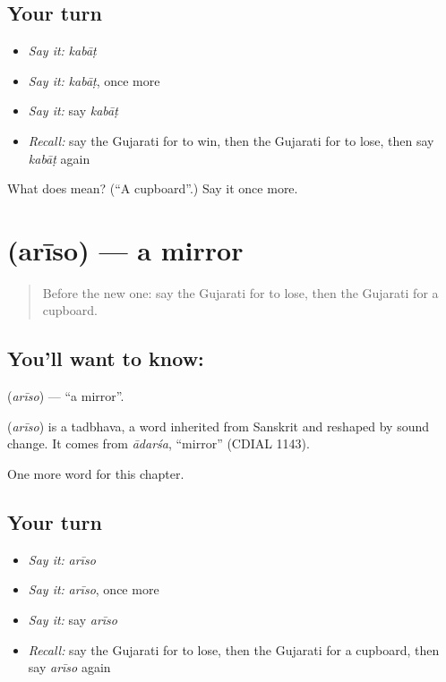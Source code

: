 \subsection*{Your turn}
\begin{itemize}
\raggedright
  \item \emph{Say it:} \emph{kabāṭ}
  \item \emph{Say it:} \emph{kabāṭ}, once more
  \item \emph{Say it:} say \emph{kabāṭ}
  \item \emph{Recall:} say the Gujarati for to win, then the Gujarati for to lose, then say \emph{kabāṭ} again
\end{itemize}

\begin{tcolorbox}[breakable,colback=teal!4,colframe=teal!35!black,title={Before you move on}]
What does  mean? (\textquotedblleft{}A cupboard\textquotedblright{}.) Say it once more.
\end{tcolorbox}
\section[\texorpdfstring{\gu{અરીસો} (arīso)}{અરીસો (arīso)}]{ (arīso) — a mirror}

\label{lesson:GU-C106-ariso}



\begin{quote}
Before the new one: say the Gujarati for to lose, then the Gujarati for a cupboard.
\end{quote}

\subsection*{You'll want to know: }
\textbf{} (\emph{arīso}) — \textquotedblleft{}a mirror\textquotedblright{}.

\begin{cousinweb}
\textbf{} (\emph{arīso}) is a tadbhava, a word inherited from Sanskrit and reshaped by sound change. It comes from \emph{ādarśa}, \textquotedblleft{}mirror\textquotedblright{} (CDIAL 1143).
\end{cousinweb}

\begin{grammarlens}[title={What you've built}]
One more word for this chapter.
\end{grammarlens}

\subsection*{Your turn}
\begin{itemize}
\raggedright
  \item \emph{Say it:} \emph{arīso}
  \item \emph{Say it:} \emph{arīso}, once more
  \item \emph{Say it:} say \emph{arīso}
  \item \emph{Recall:} say the Gujarati for to lose, then the Gujarati for a cupboard, then say \emph{arīso} again
\end{itemize}

